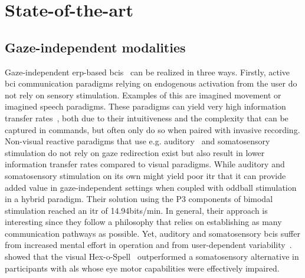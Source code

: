 \section{State-of-the-art}
\label{sec:gaze-independence}

\subsection{Gaze-independent modalities}
Gaze-independent \ac{erp}-based \ac{bci}s~\cite{Riccio2012, Aloise2012} can be realized in three
ways.
Firstly, active \ac{bci} communication paradigms relying on endogenous activation from the user
do not rely on sensory stimulation.
Examples of this are imagined movement or imagined speech paradigms.
These paradigms can yield very high information transfer
rates~\cite{Willett2021,Metzger2023}, both due to their intuitiveness and the
complexity that can be captured in commands, but often only do so when paired
with invasive recording.
Non-visual reactive paradigms that use e.g. auditory~\cite{Halder2010} and
somatosensory~\cite{Brouwer2010}
stimulation do not rely on gaze redirection exist but also result in lower information transfer
rates compared to visual paradigms.
While auditory and somatosensory stimulation on its own might yield poor
\ac{itr} \textcite{Yin2016} that it can provide added value in gaze-independent
settings when coupled with oddball stimulation in a hybrid paradigm.
Their solution using the P3 components of bimodal stimulation reached an \ac{itr} of 14.94bits/min.
In general, their approach is interesting since they follow a philosophy that
relies on establishing as many communication pathways as possible.
Yet, auditory and somatosensory \acp{bci} suffer from increased mental effort in
operation and from user-dependent variability~\cite{Severens2014,Reichert2020b}.
\textcite{Severens2014} showed that the visual Hex-o-Spell~\cite{Treder2010}
outperformed a somatosensory alternative in participants with \ac{als} whose
eye motor capabilities were effectively impaired.

